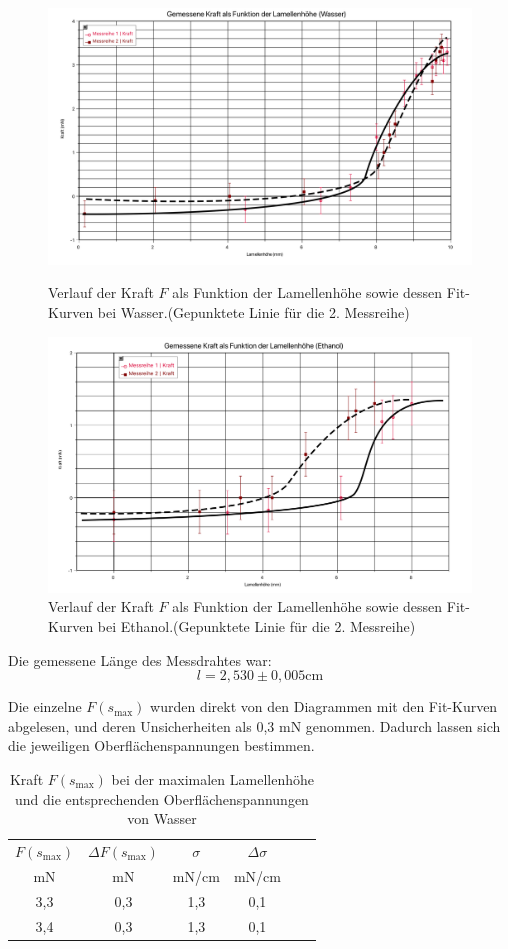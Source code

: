 \documentclass[11pt,a4paper]{article} %
\begin{document}
\begin{figure}[h!]
\includegraphics[width=\textwidth]{ex4gr1}
\caption{Verlauf der Kraft $F$ als Funktion der Lamellenhöhe sowie dessen Fit-Kurven bei Wasser.(Gepunktete Linie für die 2. Messreihe)}

\includegraphics[width=\textwidth]{ex4gr2}
\caption{Verlauf der Kraft $F$ als Funktion der Lamellenhöhe sowie dessen Fit-Kurven bei Ethanol.(Gepunktete Linie für die 2. Messreihe)}
\end{figure}
\newpage

Die gemessene Länge des Messdrahtes war:
$$l=2,530 \pm 0,005 \textrm{cm}$$


Die einzelne $F(s_{\textrm{max}})$ wurden direkt von den Diagrammen mit den Fit-Kurven abgelesen, und deren Unsicherheiten als 0,3 \textrm{mN} genommen. Dadurch lassen sich die jeweiligen Oberflächenspannungen bestimmen. 


\begin{table}[h]
	\begin{tabular*}{0.99\textwidth}{@{\extracolsep{\fill}}cccccc}
		\toprule
		$F(s_{\textrm{max}})$ & $\Delta{F(s_{\textrm{max}})}$ & $\sigma$ & $\Delta\sigma$  \\
		mN & mN &  mN/cm & mN/cm   \\
		\midrule
		3,3 & 0,3 &  1,3 & 0,1 \\
		3,4 & 0,3 & 1,3 & 0,1 \\
		
		\bottomrule
	\end{tabular*}
	\caption{Kraft $F(s_\textrm{max})$ bei der maximalen Lamellenhöhe und die entsprechenden Oberflächenspannungen von Wasser}
	\label{tabelle5}
\end{table}
\end{document}
